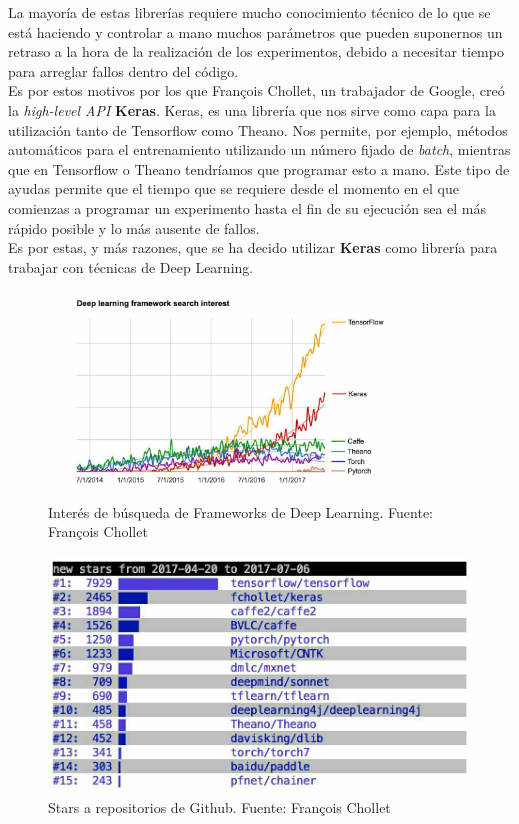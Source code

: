 La mayoría de estas librerías requiere mucho conocimiento técnico de lo que se está haciendo y controlar a mano muchos parámetros que pueden suponernos un retraso a la hora de la realización de los experimentos, debido a necesitar tiempo para arreglar fallos dentro del código.\\

Es por estos motivos por los que François Chollet, un trabajador de Google, creó la \textit{high-level API} \textbf{Keras}\cite{keras}. Keras, es una librería que nos sirve como capa para la utilización tanto de Tensorflow como Theano. Nos permite, por ejemplo, métodos automáticos para el entrenamiento utilizando un número fijado de \textit{batch}, mientras que en Tensorflow o Theano tendríamos que programar esto a mano. Este tipo de ayudas permite que el tiempo que se requiere desde el momento en el que comienzas a programar un experimento hasta el fin de su ejecución sea el más rápido posible y lo más ausente de fallos.\\

Es por estas, y más razones, que se ha decido utilizar \textbf{Keras} como librería para trabajar con técnicas de Deep Learning.\\
\begin{figure}[H]
	\label{figure1}
	\centering
	\includegraphics[width=350px]{imagenes/dlsearch.jpg}
	\caption{Interés de búsqueda de Frameworks de Deep Learning. Fuente: François Chollet}
\end{figure}

\begin{figure}[H]
	\label{figure1}
	\centering
	\includegraphics[width=\textwidth]{imagenes/dlstars.jpg}
	\caption{Stars a repositorios de Github. Fuente: François Chollet}
\end{figure}

